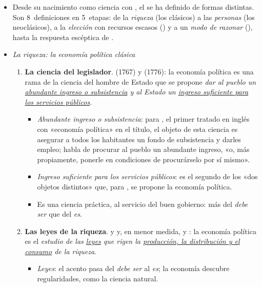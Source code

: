 \documentclass[11pt]{article}
\begin{document}
\begin{itemize}
\item Desde su nacimiento como ciencia con , el  se ha definido de formas distintas. Son 8~definiciones en 5~etapas: de la \emph{riqueza} (los clásicos) a las \emph{personas} (los neoclásicos), a la \emph{elección} con recursos escasos () y a un \emph{modo de razonar} (), hasta la respuesta escéptica de .
\end{itemize}

\begin{itemize}
\item \emph{La riqueza: la economía política clásica}
  \begin{enumerate}
  \item \textbf{La ciencia del legislador}.  (1767) y  (1776): la economía política es una rama de la ciencia del hombre de Estado que se propone \emph{dar al pueblo un \uline{abundante ingreso o subsistencia} y al Estado un \uline{ingreso suficiente para los servicios públicos}}.
    \begin{itemize}
    \item \emph{Abundante ingreso o subsistencia}: para \textcite{Steuart1767Inquiry}, el primer tratado en inglés con «economía política» en el título, el objeto de esta ciencia es asegurar a todos los habitantes un fondo de subsistencia y darles empleo;  habla de procurar al pueblo un abundante ingreso, «o, más propiamente, ponerle en condiciones de procurárselo por sí mismo»\nocite{Smith1776Wealth}.
    \item \emph{Ingreso suficiente para los servicios públicos}: es el segundo de los «dos objetos distintos» que, para , se propone la economía política\nocite{Smith1776Wealth}.
    \item Es una ciencia práctica, al servicio del buen gobierno: más del \emph{debe ser} que del \emph{es}.
    \end{itemize}
  \item \textbf{Las leyes de la riqueza}.  y  y, en menor medida,  y : la economía política es el \emph{estudio de las \uline{leyes} que rigen la \uline{producción, la distribución y el consumo} de la riqueza}\nocite{Senior1836Outline}.
    \begin{itemize}
    \item \emph{Leyes}: el acento pasa del \emph{debe ser} al \emph{es}; la economía descubre regularidades, como la ciencia natural.

\end{itemize}
\end{enumerate}
\end{itemize}
\end{document}
